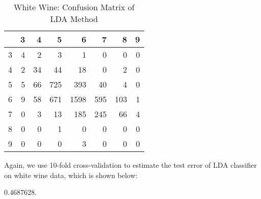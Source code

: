 \documentclass[12pt]{article}
\begin{document}
\begin{center}
\begin{table}[htbp]
\centering
\begin{tabular}{rrrrrrrr}
  \hline
 & 3 & 4 & 5 & 6 & 7 & 8 & 9 \\
  \hline
3 &   4 &   2 &   3 &   1 &   0 &   0 &   0 \\
  4 &   2 &  34 &  44 &  18 &   0 &   2 &   0 \\
  5 &   5 &  66 & 725 & 393 &  40 &   4 &   0 \\
  6 &   9 &  58 & 671 & 1598 & 595 & 103 &   1 \\
  7 &   0 &   3 &  13 & 185 & 245 &  66 &   4 \\
  8 &   0 &   0 &   1 &   0 &   0 &   0 &   0 \\
  9 &   0 &   0 &   0 &   3 &   0 &   0 &   0 \\
   \hline
\end{tabular}
\caption{White Wine: Confusion Matrix of LDA Method}
\label{tab:lda1}
\end{table}

\newpage
Again, we use 10-fold cross-validation to estimate the test error of LDA classifier on white wine data, which is shown below:
\begin{Schunk}
\begin{Soutput}
[1] 0.4687628.
\end{Soutput}
\end{Schunk}
\end{center}
\end{document}
